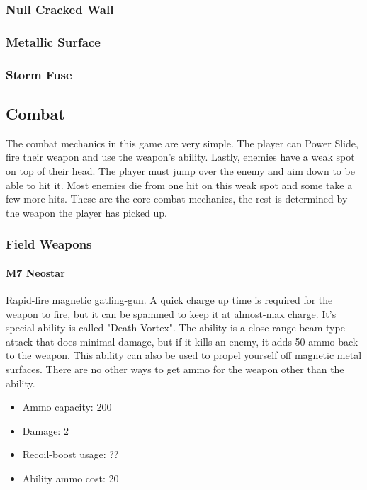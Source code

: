 \documentclass[12pt]{article}
\begin{document}
\subsubsection{Null Cracked Wall}

\subsubsection{Metallic Surface}

\subsubsection{Storm Fuse}

\subsection{Combat}

The combat mechanics in this game are very simple. The player can Power Slide, fire their weapon and use the weapon's ability. Lastly, enemies have a weak spot on top of their head. The player must jump over the enemy and aim down to be able to hit it. Most enemies die from one hit on this weak spot and some take a few more hits. These are the core combat mechanics, the rest is determined by the weapon the player has picked up.

\subsubsection{Field Weapons}

\paragraph{M7 Neostar}

Rapid-fire magnetic gatling-gun. A quick charge up time is required for the weapon to fire, but it can be spammed to keep it at almost-max charge. It's special ability is called "Death Vortex". The ability is a close-range beam-type attack that does minimal damage, but if it kills an enemy, it adds 50 ammo back to the weapon. This ability can also be used to propel yourself off magnetic metal surfaces. There are no other ways to get ammo for the weapon other than the ability.

\begin{itemize}
	\item Ammo capacity: 200
	\item Damage: 2
	\item Recoil-boost usage: ??
	\item Ability ammo cost: 20
\end{itemize}
\end{document}
